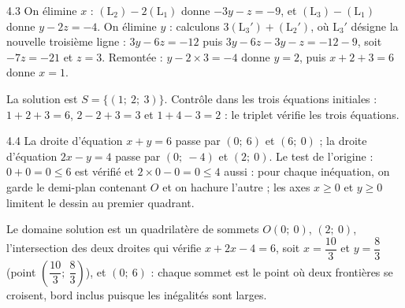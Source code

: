 \begin{corrige}{4.3}
On élimine $x$ : $(\text{L}_{2}) - 2(\text{L}_{1})$ donne $-3y - z = -9$, et $(\text{L}_{3}) - (\text{L}_{1})$ donne $y - 2z = -4$. On élimine $y$ : calculons $3(\text{L}_{3}') + (\text{L}_{2}')$, où $\text{L}_{3}'$ désigne la nouvelle troisième ligne : $3y - 6z = -12$ puis $3y - 6z - 3y - z = -12 - 9$, soit $-7z = -21$ et $z = 3$. Remontée : $y - 2 \times 3 = -4$ donne $y = 2$, puis $x + 2 + 3 = 6$ donne $x = 1$.
\par\smallskip
La solution est $S = \{(1;\ 2;\ 3)\}$. Contrôle dans les trois équations initiales : $1 + 2 + 3 = 6$, $2 - 2 + 3 = 3$ et $1 + 4 - 3 = 2$ : le triplet vérifie les trois équations.
\end{corrige}

\begin{corrige}{4.4}
La droite d'équation $x + y = 6$ passe par $(0;\ 6)$ et $(6;\ 0)$ ; la droite d'équation $2x - y = 4$ passe par $(0;\ -4)$ et $(2;\ 0)$. Le test de l'origine : $0 + 0 = 0 \leqslant 6$ est vérifié et $2 \times 0 - 0 = 0 \leqslant 4$ aussi : pour chaque inéquation, on garde le demi-plan contenant $O$ et on hachure l'autre ; les axes $x \geqslant 0$ et $y \geqslant 0$ limitent le dessin au premier quadrant.
\par\smallskip
Le domaine solution est un quadrilatère de sommets $O(0;\ 0)$, $(2;\ 0)$, l'intersection des deux droites qui vérifie $x + 2x - 4 = 6$, soit $x = \dfrac{10}{3}$ et $y = \dfrac{8}{3}$ (point $\left(\dfrac{10}{3};\ \dfrac{8}{3}\right)$), et $(0;\ 6)$ : chaque sommet est le point où deux frontières se croisent, bord inclus puisque les inégalités sont larges.
\end{corrige}

